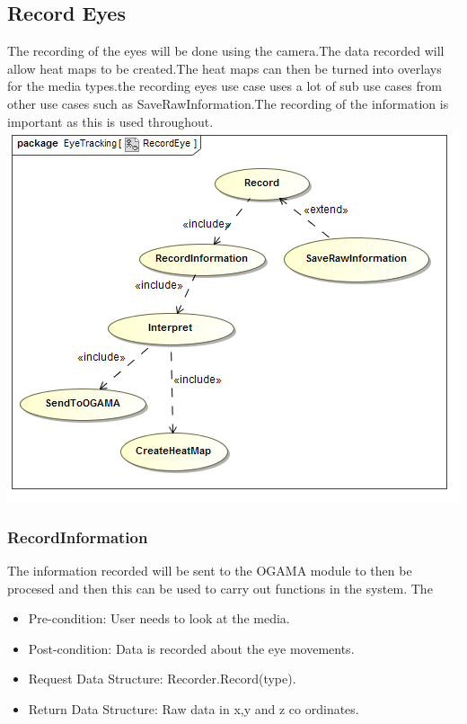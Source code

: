 	
\subsection{Record Eyes}
The recording of the eyes will be done using the camera.The data recorded will allow heat maps to be created.The heat maps can then be turned into overlays for the media types.the recording eyes use case uses a lot of sub use cases from other use cases such as SaveRawInformation.The recording of the information is important as this is used throughout.
\newline 
	\includegraphics[scale=0.5]{Diagrams/Use_Case_Diagram__RecordEye.png}
	
\subsubsection{RecordInformation}
The information recorded will be sent to the OGAMA module to then be procesed and then this can be used to carry out functions in the system.
The
\begin{itemize}
\item Pre-condition: User needs to look at the media.
\item Post-condition: Data is recorded about the eye movements.
\item Request Data Structure: Recorder.Record(type).
\item Return Data Structure: Raw data in x,y and z co ordinates.
\end{itemize}



